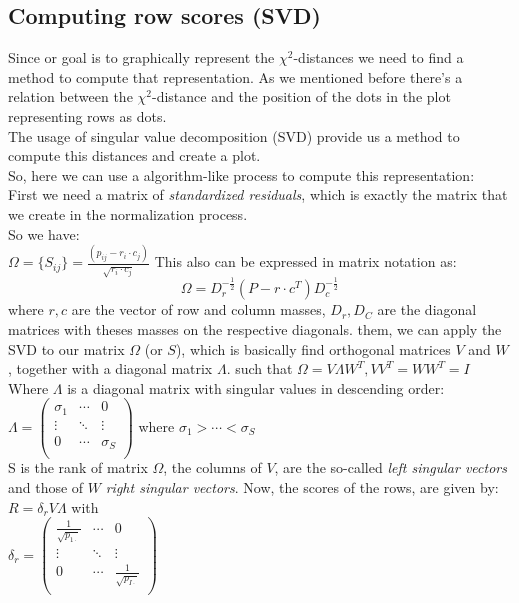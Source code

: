 \documentclass[12pt]{extarticle}
\numberwithin{equation}{section}
\begin{document}
\subsection{Computing row scores (SVD)}
Since or goal is to graphically represent  the $\chi^2$-distances we need to find a method to compute that representation. As we mentioned before there's a relation between the $\chi^2$-distance and the position of the dots in the plot representing rows as dots. \\
The usage of singular value decomposition (SVD) provide us a method to compute this distances and create a plot.\\
So, here we can use a algorithm-like process to compute this representation:\\
First we need a matrix of \emph{standardized residuals}, which is exactly the matrix that we create in the normalization process. \\
So we have: \\
$\Omega = \{S_{ij}\} = \frac{ ( p_{ij} -  r_i \cdot c_j) }{\sqrt{  r_i \cdot c_j}}$
This also can be expressed in matrix notation as: $$\Omega =D_r ^{-\frac{1}{2}} (P- r\cdot c ^T)D_c ^{-\frac{1}{2}}$$
where $r, c$ are the vector of row and column masses, $D_r, D_C$ are the diagonal matrices with theses masses on the respective diagonals.
them, we can apply the SVD to our matrix $\Omega$ (or $S$), which is basically find orthogonal matrices $V$ and $W$, together with a diagonal matrix $\Lambda$.  such that $\Omega = V \Lambda W^T, VV^T = WW^T =I$ \\
Where $\Lambda$ is a diagonal matrix with singular values in descending order: $\Lambda =  \begin{pmatrix}
\sigma_1 & \cdots &0 \\
\vdots & \ddots & \vdots \\
 0 & \cdots & \sigma_S\\
\end{pmatrix} $ where $\sigma_1 > \cdots < \sigma_S$ \\
S is the rank of matrix $\Omega$, the columns of $V$, are the so-called \emph{left singular vectors} and those of $W$ \emph{right singular vectors}.
Now, the scores of the rows, are given by: \\
$R=\delta_r V \Lambda$ with \\
$\delta_r = \begin{pmatrix}
\frac{1}{\sqrt{p_{1 \cdot}}} & \cdots &0 \\
\vdots & \ddots & \vdots \\
 0 & \cdots & \frac{1}{\sqrt{p_{I \cdot}}}\\
\end{pmatrix}$
\end{document}
